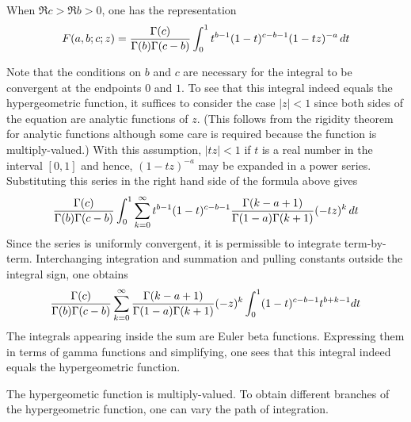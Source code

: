 \documentclass[12pt]{article}
\begin{document}
When $\Re c > \Re b > 0$, one has the representation
 $$F(a,b;c;z) = {\Gamma (c) \over \Gamma (b) \Gamma (c-b)} \int_0^1 t^{b-1} (1-t)^{c-b-1}  (1-tz)^{-a} \, dt$$

Note that the conditions on $b$ and $c$ are necessary for the integral to be convergent at the endpoints $0$ and $1$.  To see that this integral indeed equals the hypergeometric function, it suffices to consider the case $|z| < 1$ since both sides of the equation are analytic functions of $z$.  (This follows from the rigidity theorem for analytic functions although some care is required because the function is multiply-valued.)  With this assumption, $|tz| < 1$ if $t$ is a real number in the interval $[0,1]$ and hence, $(1 - tz)^{-a}$ may be expanded in a power series.  Substituting this series in the right hand side of the formula above gives
 $${\Gamma (c) \over \Gamma (b) \Gamma (c-b)} \int_0^1 \sum_{k=0}^\infty t^{b-1} (1-t)^{c-b-1} {\Gamma (k-a+1) \over \Gamma (1-a) \Gamma (k+1)} (-tz)^k  \, dt$$
Since the series is uniformly convergent, it is permissible to integrate term-by-term.  Interchanging integration and summation and pulling constants outside the integral sign, one obtains
 $${\Gamma (c) \over \Gamma (b) \Gamma (c-b)} \sum_{k=0}^\infty {\Gamma (k-a+1) \over \Gamma (1-a) \Gamma (k+1)} (-z)^k \int_0^1 (1-t)^{c-b-1} t^{b+k-1} dt$$
The integrals appearing inside the sum are Euler beta functions.  Expressing them in terms of gamma functions and simplifying, one sees that this integral indeed equals the hypergeometric function.

The hypergeometic function is multiply-valued.  To obtain different branches of the hypergeometric function, one can vary the path of integration.
\end{document}
